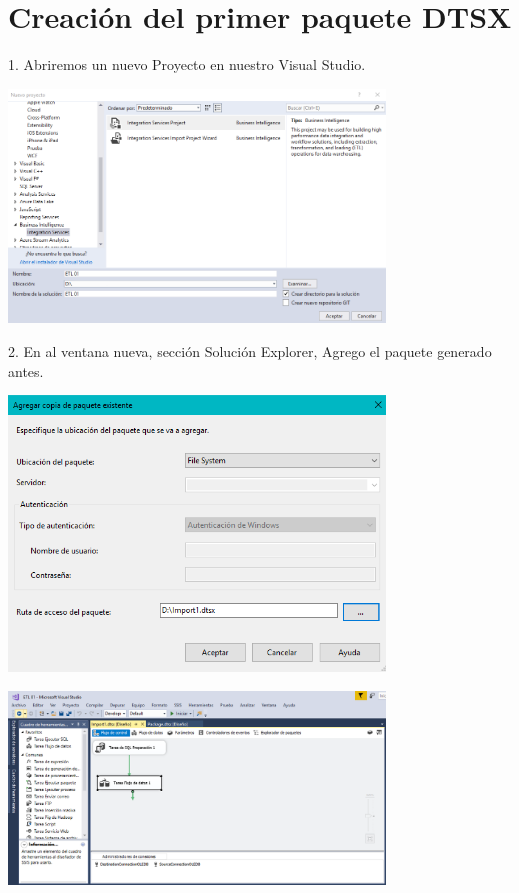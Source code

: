 \section{Creación del primer paquete DTSX}

1. Abriremos un nuevo Proyecto en nuestro Visual Studio.
	\begin{center}
	\includegraphics[width=10cm]{imagenes/img13}
	\end{center}	

2. En al ventana nueva, sección Solución Explorer, Agrego el paquete generado antes.
	\begin{center}
	\includegraphics[width=10cm]{imagenes/img14}
    \end{center}	
    
	\begin{center}
	\includegraphics[width=10cm]{imagenes/img15}
    \end{center}	
    
